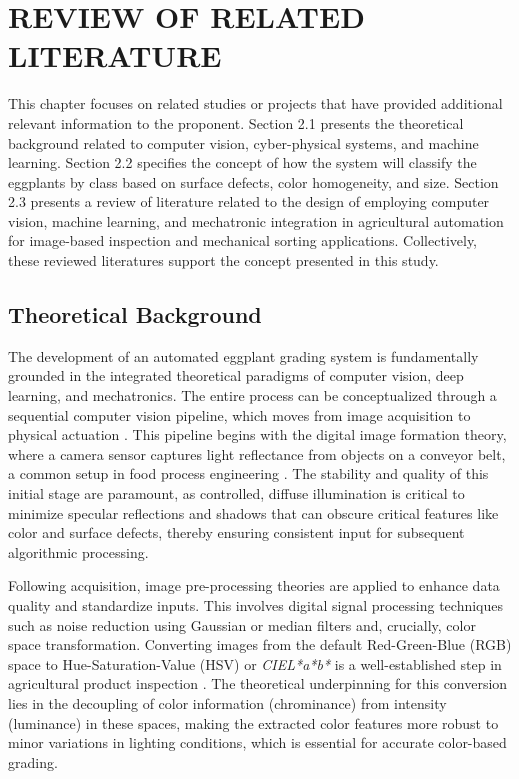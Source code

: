 \chapter{REVIEW OF RELATED LITERATURE}
{\baselineskip
 This chapter focuses on related studies or projects that have provided additional relevant information to the proponent. Section 2.1 presents the theoretical background related to computer vision, cyber-physical systems, and machine learning. Section 2.2 specifies the concept of how the system will classify the eggplants by class based on surface defects, color homogeneity, and size. Section 2.3 presents a review of literature related to the design of employing computer vision, machine learning, and mechatronic integration in agricultural automation for image-based inspection and mechanical sorting applications. Collectively, these reviewed literatures support the concept presented in this study. 


\section{Theoretical Background}
The development of an automated eggplant grading system is fundamentally grounded in the integrated theoretical paradigms of computer vision, deep learning, and mechatronics. The entire process can be conceptualized through a sequential computer vision pipeline, which moves from image acquisition to physical actuation \citep{szeliski2022computer}. This pipeline begins with the digital image formation theory, where a camera sensor captures light reflectance from objects on a conveyor belt, a common setup in food process engineering \citep{dougherty2020digital}. The stability and quality of this initial stage are paramount, as controlled, diffuse illumination is critical to minimize specular reflections and shadows that can obscure critical features like color and surface defects, thereby ensuring consistent input for subsequent algorithmic processing.

Following acquisition, image pre-processing theories are applied to enhance data quality and standardize inputs. This involves digital signal processing techniques such as noise reduction using Gaussian or median filters \citep{kumar2020comparative} and, crucially, color space transformation. Converting images from the default Red-Green-Blue (RGB) space to Hue-Saturation-Value (HSV) or \textit{CIEL*a*b*} is a well-established step in agricultural product inspection \citep{khan2024intelligent}. The theoretical underpinning for this conversion lies in the decoupling of color information (chrominance) from intensity (luminance) in these spaces, making the extracted color features more robust to minor variations in lighting conditions, which is essential for accurate color-based grading.

}
